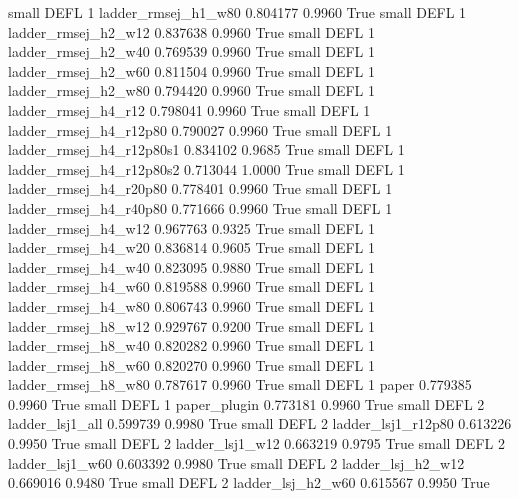      small     DEFL                 1      ladder_rmsej_h1_w80   0.804177      0.9960    True
     small     DEFL                 1      ladder_rmsej_h2_w12   0.837638      0.9960    True
     small     DEFL                 1      ladder_rmsej_h2_w40   0.769539      0.9960    True
     small     DEFL                 1      ladder_rmsej_h2_w60   0.811504      0.9960    True
     small     DEFL                 1      ladder_rmsej_h2_w80   0.794420      0.9960    True
     small     DEFL                 1      ladder_rmsej_h4_r12   0.798041      0.9960    True
     small     DEFL                 1   ladder_rmsej_h4_r12p80   0.790027      0.9960    True
     small     DEFL                 1 ladder_rmsej_h4_r12p80s1   0.834102      0.9685    True
     small     DEFL                 1 ladder_rmsej_h4_r12p80s2   0.713044      1.0000    True
     small     DEFL                 1   ladder_rmsej_h4_r20p80   0.778401      0.9960    True
     small     DEFL                 1   ladder_rmsej_h4_r40p80   0.771666      0.9960    True
     small     DEFL                 1      ladder_rmsej_h4_w12   0.967763      0.9325    True
     small     DEFL                 1      ladder_rmsej_h4_w20   0.836814      0.9605    True
     small     DEFL                 1      ladder_rmsej_h4_w40   0.823095      0.9880    True
     small     DEFL                 1      ladder_rmsej_h4_w60   0.819588      0.9960    True
     small     DEFL                 1      ladder_rmsej_h4_w80   0.806743      0.9960    True
     small     DEFL                 1      ladder_rmsej_h8_w12   0.929767      0.9200    True
     small     DEFL                 1      ladder_rmsej_h8_w40   0.820282      0.9960    True
     small     DEFL                 1      ladder_rmsej_h8_w60   0.820270      0.9960    True
     small     DEFL                 1      ladder_rmsej_h8_w80   0.787617      0.9960    True
     small     DEFL                 1                    paper   0.779385      0.9960    True
     small     DEFL                 1             paper_plugin   0.773181      0.9960    True
     small     DEFL                 2          ladder_lsj1_all   0.599739      0.9980    True
     small     DEFL                 2       ladder_lsj1_r12p80   0.613226      0.9950    True
     small     DEFL                 2          ladder_lsj1_w12   0.663219      0.9795    True
     small     DEFL                 2          ladder_lsj1_w60   0.603392      0.9980    True
     small     DEFL                 2        ladder_lsj_h2_w12   0.669016      0.9480    True
     small     DEFL                 2        ladder_lsj_h2_w60   0.615567      0.9950    True
